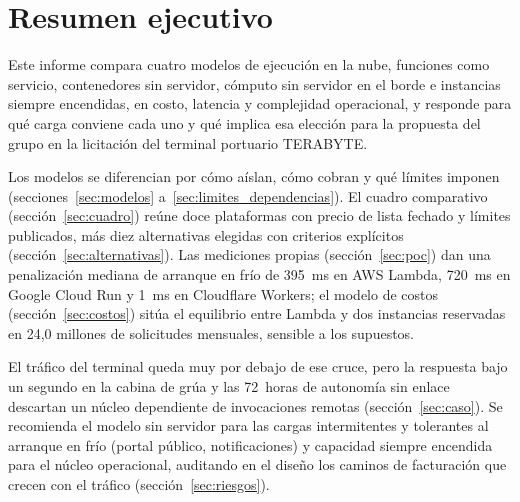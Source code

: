 \documentclass[12pt, letterpaper, table, xcdraw]{inf-pucv}
\begin{document}

\setcounter{page}{1}

{}
\section*{Resumen ejecutivo}


Este informe compara cuatro modelos de ejecución en la nube, funciones como servicio, contenedores sin servidor, cómputo sin servidor en el borde e instancias siempre encendidas, en costo, latencia y complejidad operacional, y responde para qué carga conviene cada uno y qué implica esa elección para la propuesta del grupo en la licitación del terminal portuario TERABYTE.

Los modelos se diferencian por cómo aíslan, cómo cobran y qué límites imponen (secciones~\ref{sec:modelos} a~\ref{sec:limites_dependencias}). El cuadro comparativo (sección~\ref{sec:cuadro}) reúne doce plataformas con precio de lista fechado y límites publicados, más diez alternativas elegidas con criterios explícitos (sección~\ref{sec:alternativas}). Las mediciones propias (sección~\ref{sec:poc}) dan una penalización mediana de arranque en frío de 395~ms en AWS Lambda, 720~ms en Google Cloud Run y 1~ms en Cloudflare Workers; el modelo de costos (sección~\ref{sec:costos}) sitúa el equilibrio entre Lambda y dos instancias reservadas en 24,0 millones de solicitudes mensuales, sensible a los supuestos.

El tráfico del terminal queda muy por debajo de ese cruce, pero la respuesta bajo un segundo en la cabina de grúa y las 72~horas de autonomía sin enlace descartan un núcleo dependiente de invocaciones remotas (sección~\ref{sec:caso}). Se recomienda el modelo sin servidor para las cargas intermitentes y tolerantes al arranque en frío (portal público, notificaciones) y capacidad siempre encendida para el núcleo operacional, auditando en el diseño los caminos de facturación que crecen con el tráfico (sección~\ref{sec:riesgos}).
\end{document}
